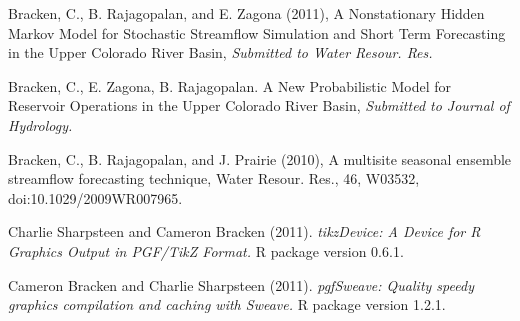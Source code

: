 \documentclass[10pt,a4paper]{scrartcl}
\begin{document}
\begin{cv}{}
        \begin{cvlist}{}\label{pub}
	        \item Bracken, C., B. Rajagopalan, and E. Zagona (2011), A Nonstationary Hidden Markov Model for Stochastic Streamflow Simulation and Short Term Forecasting in the Upper Colorado River Basin, {\it Submitted to Water Resour. Res.}
	        \item Bracken, C., E. Zagona, B. Rajagopalan. A New Probabilistic Model for Reservoir Operations in the Upper Colorado River Basin, {\it Submitted to Journal of Hydrology.}
            \item   Bracken, C., B. Rajagopalan, and J. Prairie (2010), A multisite seasonal ensemble streamflow forecasting technique, Water Resour. Res., 46, W03532, doi:10.1029/2009WR007965.
           
         \end{cvlist}

        \begin{cvlist}{}\label{software}
            \item Charlie Sharpsteen and Cameron Bracken (2011). \textit{tikzDevice: A Device for R Graphics Output in PGF/TikZ Format.}  R package version 0.6.1.
            \item Cameron Bracken  and Charlie Sharpsteen (2011). \textit{pgfSweave: Quality speedy graphics compilation and caching with Sweave.} R package version 1.2.1.
        \end{cvlist}


\end{cv}
\end{document}
